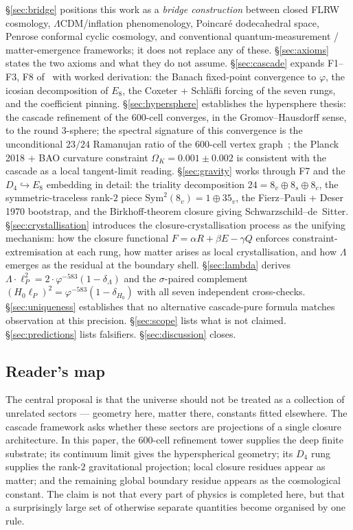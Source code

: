 \documentclass[11pt]{article}
\theoremstyle{plain}
\theoremstyle{definition}
\theoremstyle{remark}
\newcommand{\Sym}{\mathrm{Sym}}
\begin{document}
\S\ref{sec:bridge} positions this work as a \emph{bridge construction} between closed FLRW cosmology, $\Lambda$CDM/inflation phenomenology, Poincar\'e dodecahedral space, Penrose conformal cyclic cosmology, and conventional quantum-measurement / matter-emergence frameworks; it does not replace any of these. \S\ref{sec:axioms} states the two axioms and what they do not assume. \S\ref{sec:cascade} expands F1--F3, F8 of~\citet{SmartXXXVI} with worked derivation: the Banach fixed-point convergence to $\varphi$, the icosian decomposition of $E_8$, the Coxeter + Schl\"afli forcing of the seven rungs, and the coefficient pinning. \S\ref{sec:hypersphere} establishes the hypersphere thesis: the cascade refinement of the 600-cell converges, in the Gromov--Hausdorff sense, to the round 3-sphere; the spectral signature of this convergence is the unconditional $23/24$ Ramanujan ratio of the 600-cell vertex graph~\citep{rhTwoSphere}; the Planck 2018 + BAO curvature constraint $\Omega_K = 0.001 \pm 0.002$ is consistent with the cascade as a local tangent-limit reading. \S\ref{sec:gravity} works through F7 and the $D_4 \hookrightarrow E_8$ embedding in detail: the triality decomposition $24 = 8_v \oplus 8_s \oplus 8_c$, the symmetric-traceless rank-$2$ piece $\Sym^2(8_v) = 1 \oplus 35_v$, the Fierz--Pauli + Deser 1970 bootstrap, and the Birkhoff-theorem closure giving Schwarzschild--de~Sitter. \S\ref{sec:crystallisation} introduces the closure-crystallisation process as the unifying mechanism: how the closure functional $F = \alpha R + \beta E - \gamma Q$ enforces constraint-extremisation at each rung, how matter arises as local crystallisation, and how $\Lambda$ emerges as the residual at the boundary shell. \S\ref{sec:lambda} derives $\Lambda \cdot \ell_P^2 = 2 \cdot \varphi^{-583}(1-\delta_\Lambda)$ and the $\sigma$-paired complement $(H_0 \ell_P)^2 = \varphi^{-583}(1-\delta_{H_0})$ with all seven independent cross-checks. \S\ref{sec:uniqueness} establishes that no alternative cascade-pure formula matches observation at this precision. \S\ref{sec:scope} lists what is not claimed. \S\ref{sec:predictions} lists falsifiers. \S\ref{sec:discussion} closes.

\subsection{Reader's map}\label{sec:readers-map}

The central proposal is that the universe should not be treated as a collection of unrelated sectors --- geometry here, matter there, constants fitted elsewhere. The cascade framework asks whether these sectors are projections of a single closure architecture. In this paper, the 600-cell refinement tower supplies the deep finite substrate; its continuum limit gives the hyperspherical geometry; its $D_4$ rung supplies the rank-$2$ gravitational projection; local closure residues appear as matter; and the remaining global boundary residue appears as the cosmological constant. The claim is not that every part of physics is completed here, but that a surprisingly large set of otherwise separate quantities become organised by one rule.
\end{document}
